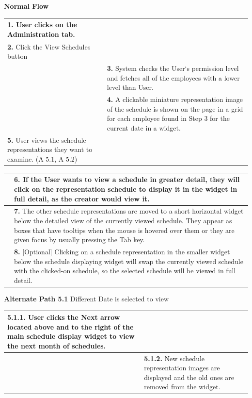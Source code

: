 \documentclass[letterpaper,12pt]{report}
\begin{document}
{ \centering \textbf{Normal Flow}
\begin{center}
\xuchead
\begin{tabular}{| p{8.5cm} | p{8.5cm} |}
\hline
\textbf{1.} User clicks on the Administration tab. & \\
\hline
\textbf{2.} Click the View Schedules button & \\
\hline
& \textbf{3.} System\index{system} checks the User`s permission level and fetches all of the  employees with a lower level than User. \\
\hline
& \textbf{4.} A clickable miniature representation image of the schedule is shown on the page in a grid for each employee found in Step 3 for the current date in a widget. \\
\hline
\textbf{5.} User views the schedule representations they want to examine. (A 5.1, A 5.2) & \\
\hline

\end{tabular}
\end{center}
\pagebreak

\begin{center}
\xuchead
\begin{tabular}{| p{8.5cm} | p{8.5cm} |}
\hline
& \textbf{6.} If the User wants to view a schedule in greater detail, they will click on the representation schedule to display it in the widget in full detail, as the creator would view it. \\
\hline
& \textbf{7.} The other schedule representations are moved to a short horizontal widget below the detailed view of the currently viewed schedule. They appear as boxes that have tooltips when the mouse is hovered over them or they are given focus by usually pressing the Tab key. \\
\hline
& \textbf{8.} [Optional] Clicking on a schedule representation in the smaller widget below the schedule displaying widget will swap the currently viewed schedule with the clicked-on schedule, so the selected schedule will be viewed in full detail. \\
\hline
\end{tabular}
\end{center}

\centering \textbf{Alternate Path 5.1}
\linebreak Different Date is selected to view
\begin{center}
\xuchead
\begin{tabular}{| p{8.5cm} | p{8.5cm} |}
\hline
\textbf{5.1.1.} User clicks the Next arrow located above and to the right of the main schedule display widget to view the next month of schedules. & \\
\hline
& \textbf{5.1.2.} New schedule representation images are displayed and the old ones are removed from the widget. \\
\hline
\end{tabular}
\end{center}
\pagebreak

}
\end{document}
